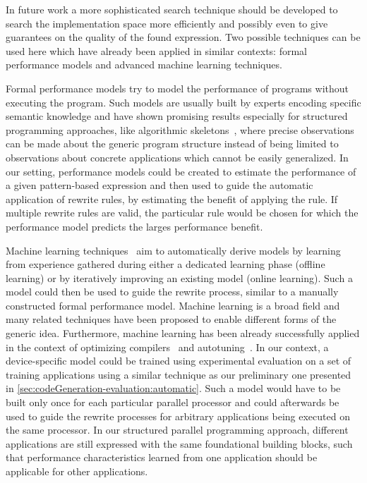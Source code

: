 In future work a more sophisticated search technique should be developed to search the implementation space more efficiently and possibly even to give guarantees on the quality of the found expression.
Two possible techniques can be used here which have already been applied in similar contexts:
formal performance models and advanced machine learning techniques.

Formal performance models try to model the performance of programs without executing the program.
Such models are usually built by experts encoding specific semantic knowledge and have shown promising results especially for structured programming approaches, like algorithmic skeletons~\cite{DarlingtonFHKSW93,Alt2007,HayashiC02}, where precise observations can be made about the generic program structure instead of being limited to observations about concrete applications which cannot be easily generalized.
In our setting, performance models could be created to estimate the performance of a given pattern-based expression and then used to guide the automatic application of rewrite rules, by estimating the benefit of applying the rule.
If multiple rewrite rules are valid, the particular rule would be chosen for which the performance model predicts the larges performance benefit.

Machine learning techniques~\cite{Bishop2007} aim to automatically derive models by learning from experience gathered during either a dedicated learning phase (offline learning) or by iteratively improving an existing model (online learning).
Such a model could then be used to guide the rewrite process, similar to a manually constructed formal performance model.
Machine learning is a broad field and many related techniques have been proposed to enable different forms of the generic idea.
Furthermore, machine learning has been already successfully applied in the context of optimizing compilers~\cite{DubachJBFO09} and autotuning~\cite{CollinsFLC13}.
In our context, a device-specific model could be trained using experimental evaluation on a set of training applications using a similar technique as our preliminary one presented in \autoref{sec:codeGeneration-evaluation:automatic}.
Such a model would have to be built only once for each particular parallel processor and could afterwards be used to guide the rewrite processes for arbitrary applications being executed on the same processor.
In our structured parallel programming approach, different applications are still expressed with the same foundational building blocks, such that performance characteristics learned from one application should be applicable for other applications.

